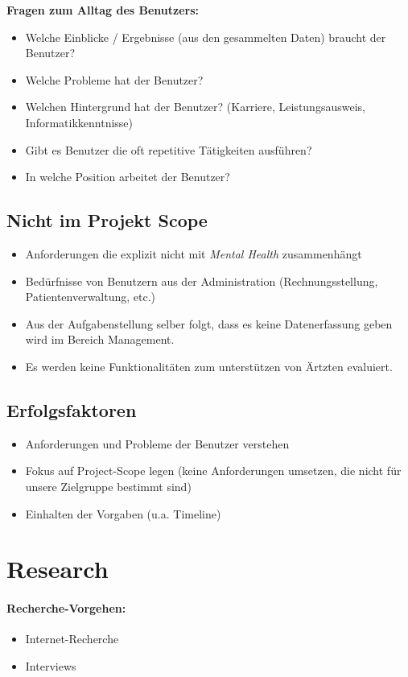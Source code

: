 \documentclass[a4paper]{scrreprt}
\begin{document}
\textbf{Fragen zum Alltag des Benutzers:}

\begin{itemize}
\item Welche Einblicke / Ergebnisse (aus den gesammelten Daten) braucht der Benutzer?
\item Welche Probleme hat der Benutzer?
\item Welchen Hintergrund hat der Benutzer? (Karriere, Leistungsausweis, Informatikkenntnisse)
\item Gibt es Benutzer die oft repetitive Tätigkeiten ausführen?
\item In welche Position arbeitet der Benutzer?
\end{itemize}

\subsection{Nicht im Projekt Scope}

\begin{itemize}
\item Anforderungen die explizit nicht mit \textit{Mental Health} zusammenhängt
\item Bedürfnisse von Benutzern aus der Administration (Rechnungsstellung, Patientenverwaltung, etc.)
\item Aus der Aufgabenstellung selber folgt, dass es keine Datenerfassung geben wird im Bereich Management.
\item Es werden keine Funktionalitäten zum unterstützen von Ärtzten evaluiert. 
\end{itemize} 

\subsection{Erfolgsfaktoren}

\begin{itemize}
\item Anforderungen und Probleme der Benutzer verstehen
\item Fokus auf Project-Scope legen (keine Anforderungen umsetzen, die nicht für unsere Zielgruppe bestimmt sind)
\item Einhalten der Vorgaben (u.a. Timeline)
\end{itemize} 


\section{Research}
\paragraph{Recherche-Vorgehen:} 
\begin{itemize}
\item Internet-Recherche
\item Interviews
\end{itemize}
\end{document}
